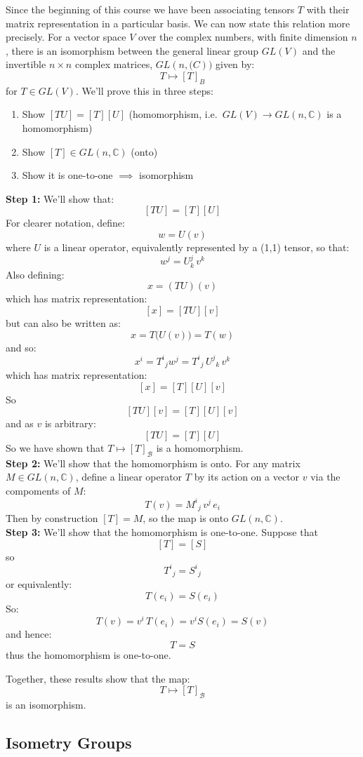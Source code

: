 \documentclass[12pt]{article}
\begin{document}
Since the beginning of this course we have been associating tensors
$T$ with their matrix representation in a particular basis.  We can
now state this relation more precisely.  For a vector space $V$ over
the complex numbers, with finite dimension $n$, there is an
isomorphism between the general linear group $GL(V)$ and the
invertible $n \times n$ complex matrices, $GL(n, \mathbb(C))$ given
by:
$$T \mapsto [T]_{B}$$
for $T \in GL(V)$.  We'll prove this in three steps:
\begin{enumerate}
  \item Show $[TU] = [T][U]$ (homomorphism, i.e.\ $GL(V) \to GL(n,\mathbb{C})$ is a homomorphism)
  \item Show $[T] \in GL(n,\mathbb{C})$ (onto)
  \item Show it is one-to-one $\implies$ isomorphism \checkmark
\end{enumerate}
\textbf{Step 1:} We'll show that:
$$[TU] = [T][U]$$
For clearer notation, define:
$$w = U(v)$$
where $U$ is a linear operator, equivalently represented by a (1,1) tensor, so that:
$$w^j = U^j_k \, v^k$$
Also defining:
$$x = (TU)(v)$$
which has matrix representation:
$$[x] = [TU][v]$$
but can also be written as:
$$x = T\bigl(U(v)\bigr) = T(w)$$
and so:
$$x^i = T^i{}_j w^j = T^i{}_j\,U^j{}_k\,v^k$$
which has matrix representation:
$$[x] = [T][U][v]$$
So
$$[TU][v] = [T][U][v]$$
and as $v$ is arbitrary:
$$[TU]=[T][U]$$
So we have shown that $T \mapsto [T]_\mathcal{B}$ is a homomorphism.\\[5pt]

\noindent
\textbf{Step 2:} We'll show that the homomorphism is onto.  For any matrix $M \in GL(n,\mathbb{C})$, define a linear operator $T$ by its action on a vector $v$ via the compoments of $M$:
\begin{equation*}
  T(v) = M^i{}_j\, v^j\, e_i
\end{equation*}
Then by construction $[T] = M$, so the map is onto $GL(n,\mathbb{C})$.\\[5pt]

\noindent
\textbf{Step 3:} We'll show that the homomorphism is one-to-one.  Suppose that
$$[T]=[S]$$
so
$$T^i{}_j = S^i{}_j$$
or equivalently:
$$T(e_i) = S(e_i)$$
So:
$$T(v) = v^i\,T(e_i) = v^i S(e_i) = S(v)$$
and hence:
$$T = S$$
thus the homomorphism is one-to-one.

Together, these results show that the map:
$$T \mapsto  [T]_\mathcal{B}$$
is an isomorphism.

\subsection*{Isometry Groups}
\end{document}
